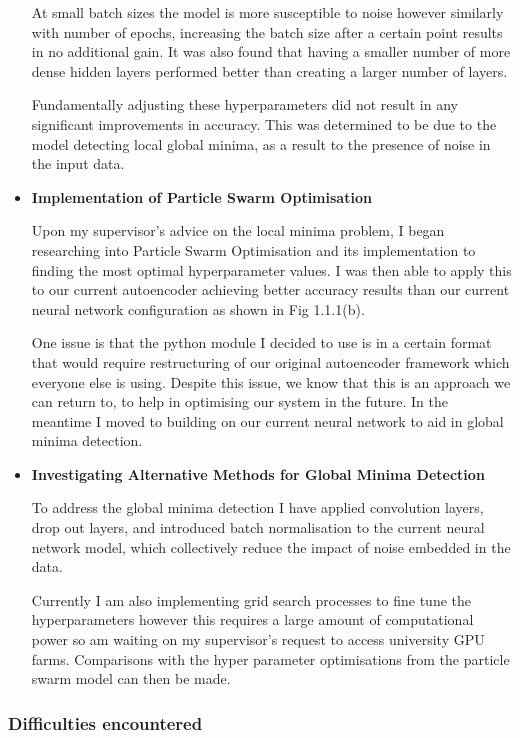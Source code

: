 \begin{itemize}
    At small batch sizes the model is more susceptible to noise however similarly with number of epochs, increasing the batch size after a certain point results in no additional gain. It was also found that having a smaller number of more dense hidden layers performed better than creating a larger number of layers.
    
    Fundamentally adjusting these hyperparameters did not result in any significant improvements in accuracy. This was determined to be due to the model detecting local global minima, as a result to the presence of noise in the input data.
    
    \item \textbf{Implementation of Particle Swarm Optimisation}
    
    Upon my supervisor's advice on the local minima problem, I began researching into Particle Swarm Optimisation \autocite{10.1145/3071178.3071208} and its implementation to finding the most optimal hyperparameter values. I was then able to apply this to our current autoencoder achieving better accuracy results than our current neural network configuration as shown in Fig 1.1.1(b). 
    
    One issue is that the python module I decided to use is in a certain format that would require restructuring of our original autoencoder framework which everyone else is using. Despite this issue, we know that this is an approach we can return to, to help in optimising our system in the future. In the meantime I moved to building on our current neural network to aid in global minima detection.
    
    \item \textbf{Investigating Alternative Methods for Global Minima Detection}
    
    To address the global minima detection I have applied convolution layers, drop out layers, and introduced batch normalisation to the current neural network model, which collectively reduce the impact of noise embedded in the data. 
    
    Currently I am also implementing grid search processes to fine tune the hyperparameters however this requires a large amount of computational power so am waiting on my supervisor's request to access university GPU farms. Comparisons with the hyper parameter optimisations from the particle swarm model can then be made. 
\end{itemize}

\subsubsection{Difficulties encountered}

